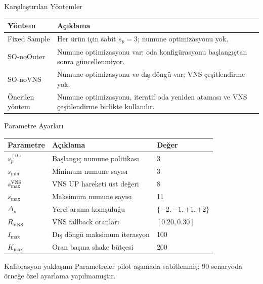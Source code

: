 \documentclass[aspectratio=169,11pt]{beamer}
\begin{document}
\begin{frame}{Karşılaştırılan Yöntemler}
  \begin{tabularx}{\textwidth}{p{}Y}
    \toprule
    \textbf{Yöntem} & \textbf{Açıklama} \\
    \midrule
    Fixed Sample & Her ürün için sabit $s_p=3$; numune optimizasyonu yok. \\
    \addlinespace
    SO-noOuter & Numune optimizasyonu var; oda konfigürasyonu başlangıçtan sonra güncellenmiyor. \\
    \addlinespace
    SO-noVNS & Numune optimizasyonu ve dış döngü var; VNS çeşitlendirme yok. \\
    \addlinespace
    Önerilen yöntem & Numune optimizasyonu, iteratif oda yeniden ataması ve VNS çeşitlendirme birlikte kullanılır. \\
    \bottomrule
  \end{tabularx}
\end{frame}

\begin{frame}{Parametre Ayarları}
  \begin{table}
    \centering
    \small
    \begin{tabular}{lll}
      \toprule
      \textbf{Parametre} & \textbf{Açıklama} & \textbf{Değer} \\
      \midrule
      $s_p^{(0)}$ & Başlangıç numune politikası & 3 \\
      $s_{\min}$ & Minimum numune sayısı & 3 \\
      $s_{\max}^{\mathrm{VNS}}$ & VNS UP hareketi üst değeri & 8 \\
      $s_{\max}$ & Maksimum numune sayısı & 11 \\
      $\Delta_p$ & Yerel arama komşuluğu & $\{-2,-1,+1,+2\}$ \\
      $R_{\mathrm{VNS}}$ & VNS fallback oranları & $[0.20,0.30]$ \\
      $I_{\max}$ & Dış döngü maksimum iterasyon & 100 \\
      $K_{\max}$ & Oran başına shake bütçesi & 200 \\
      \bottomrule
    \end{tabular}
  \end{table}

  \begin{block}{Kalibrasyon yaklaşımı}
    Parametreler pilot aşamada sabitlenmiş; 90 senaryoda örneğe özel ayarlama yapılmamıştır.
  \end{block}
\end{frame}
\end{document}
